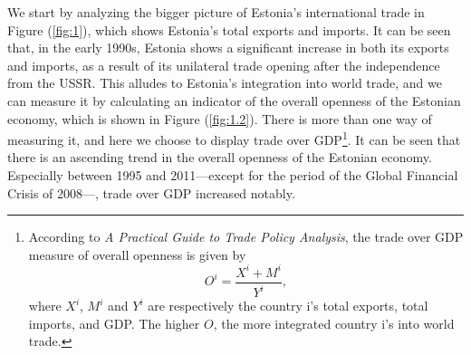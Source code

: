 \documentclass[a4paper,10pt]{article}
\begin{document}
We start by analyzing the bigger picture of Estonia's international trade in Figure (\ref{fig:1}), which shows Estonia's total exports and imports. It can be seen that, in the early 1990s, Estonia shows a significant increase in both its exports and imports, as a result of its unilateral trade opening after the independence from the USSR. This alludes to Estonia's integration into world trade, and we can measure it by calculating an indicator of the overall openness of the Estonian economy, which is shown in Figure (\ref{fig:1.2}). There is more than one way of measuring it, and here we choose to display trade over GDP\footnote{According to \textit{A Practical Guide to Trade Policy Analysis}, the trade over GDP measure of overall openness is given by $$O^{i} = \frac{X^{i} + M^{i}}{Y^{i}},$$ where $X^{i}$, $M^{i}$ and $Y^{i}$ are respectively the country i's total exports, total imports, and GDP. The higher $O$, the more integrated country i's into world trade.}. It can be seen that there is an ascending trend in the overall openness of the Estonian economy. Especially between 1995 and 2011---except for the period of the Global Financial Crisis of 2008---, trade over GDP increased notably.
\end{document}
